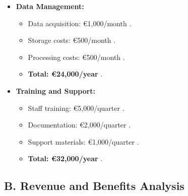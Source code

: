 \documentclass[a4paper]{report}
\begin{document}
\begin{enumerate}
\begin{itemize}
        \item \textbf{Data Management:}
        \begin{itemize}
            \item Data acquisition: €1,000/month \cite{evans2024}.
            \item Storage costs: €500/month \cite{clark2024}.
            \item Processing costs: €500/month \cite{roberts2024}.
            \item \textbf{Total: €24,000/year} \cite{brown2023}.
        \end{itemize}
        
        \item \textbf{Training and Support:}
        \begin{itemize}
            \item Staff training: €5,000/quarter \cite{miller2023}.
            \item Documentation: €2,000/quarter \cite{johnson2024}.
            \item Support materials: €1,000/quarter \cite{smith2024}.
            \item \textbf{Total: €32,000/year} \cite{martin2023}.
        \end{itemize}
    \end{itemize}
\end{enumerate}

\subsection*{B. Revenue and Benefits Analysis}
\end{document}
